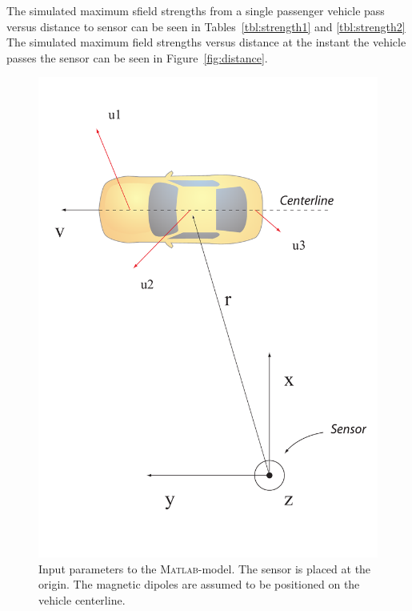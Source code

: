The simulated maximum sfield strengths from a single passenger vehicle pass versus distance to sensor can be seen in Tables~\ref{tbl:strength1} and \ref{tbl:strength2} The simulated maximum field strengths versus distance at the instant the vehicle passes the sensor can be seen in Figure~\ref{fig:distance}.

\begin{figure}[!htbf]
 \centering
 \begin{minipage}{0.4\linewidth}
  \includegraphics[width=1\linewidth]{images/sensoraxis}
 \caption[Input parameters to the \textsc{Matlab}-model.]{Input parameters to the \textsc{Matlab}-model. The sensor is placed at the origin. The magnetic dipoles are assumed to be positioned on the vehicle centerline.}
 \label{fig:sensoraxis}
 \end{minipage}
\end{figure}


